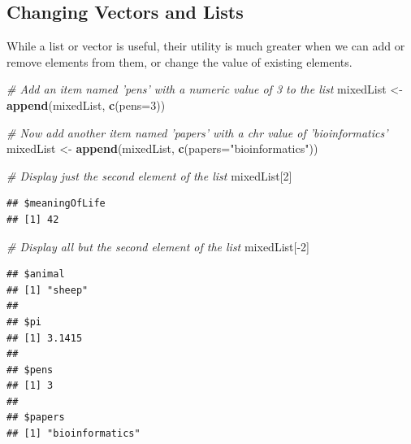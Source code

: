 \documentclass[a4paper]{book}
\newenvironment{Shaded}{\begin{snugshade}}{\end{snugshade}}
\newcommand{\KeywordTok}[1]{\textcolor[rgb]{0.13,0.29,0.53}{\textbf{{#1}}}}
\newcommand{\DataTypeTok}[1]{\textcolor[rgb]{0.13,0.29,0.53}{{#1}}}
\newcommand{\DecValTok}[1]{\textcolor[rgb]{0.00,0.00,0.81}{{#1}}}
\newcommand{\StringTok}[1]{\textcolor[rgb]{0.31,0.60,0.02}{{#1}}}
\newcommand{\CommentTok}[1]{\textcolor[rgb]{0.56,0.35,0.01}{\textit{{#1}}}}
\newcommand{\OtherTok}[1]{\textcolor[rgb]{0.56,0.35,0.01}{{#1}}}
\newcommand{\NormalTok}[1]{{#1}}
\renewenvironment{Shaded}
{\vspace{1.5em}\begin{leftbar}\begin{snugshade}}
{\end{snugshade}\end{leftbar}\vspace{3pt}}
\begin{document}
\subsection{Changing Vectors and
Lists}\label{changing-vectors-and-lists}

While a list or vector is useful, their utility is much greater when we
can add or remove elements from them, or change the value of existing
elements.

\begin{Shaded}
\begin{Highlighting}[]
\CommentTok{# Add an item named 'pens' with a numeric value of 3 to the list}
\NormalTok{mixedList <-}\StringTok{ }\KeywordTok{append}\NormalTok{(mixedList, }\KeywordTok{c}\NormalTok{(}\DataTypeTok{pens=}\DecValTok{3}\NormalTok{))}

\CommentTok{# Now add another item named 'papers' with a chr value of 'bioinformatics'}
\NormalTok{mixedList <-}\StringTok{ }\KeywordTok{append}\NormalTok{(mixedList, }\KeywordTok{c}\NormalTok{(}\DataTypeTok{papers=}\StringTok{"bioinformatics"}\NormalTok{))}

\CommentTok{# Display just the second element of the list}
\NormalTok{mixedList[}\DecValTok{2}\NormalTok{]}
\end{Highlighting}
\end{Shaded}

\begin{verbatim}
## $meaningOfLife
## [1] 42
\end{verbatim}

\begin{Shaded}
\begin{Highlighting}[]
\CommentTok{# Display all but the second element of the list}
\NormalTok{mixedList[-}\DecValTok{2}\NormalTok{]}
\end{Highlighting}
\end{Shaded}

\begin{verbatim}
## $animal
## [1] "sheep"
## 
## $pi
## [1] 3.1415
## 
## $pens
## [1] 3
## 
## $papers
## [1] "bioinformatics"
\end{verbatim}

\begin{Shaded}
\end{Shaded}
\end{document}
